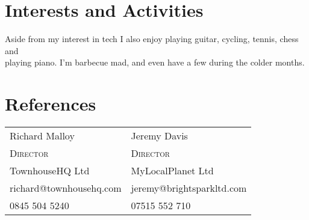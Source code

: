 \documentclass[a4paper,11pt]{article}
\begin{document}
\section{Interests and Activities}
Aside from my interest in tech I also enjoy playing guitar, cycling, tennis, chess and \\
playing piano. I'm barbecue mad, and even have a few during the colder months.
\section{References}
\begin{tabular}{l|l}
  Richard Malloy          & Jeremy Davis\\
  \textsc{Director}       & \textsc{Director}\\
  TownhouseHQ Ltd         & MyLocalPlanet Ltd\\
  richard@townhousehq.com & jeremy@brightsparkltd.com\\
  0845 504 5240           & 07515 552 710
\end{tabular}
\end{document}
